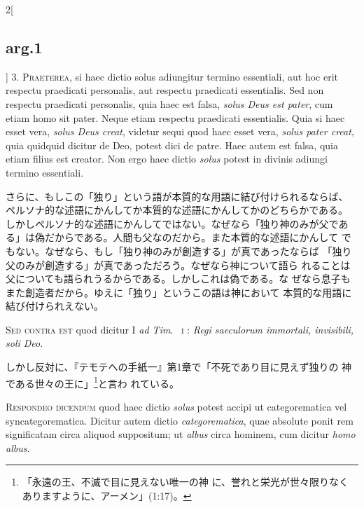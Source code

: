 \documentclass[paper=a4paper,fontsize=10pt,jafontsize=9pt,titlepage]{jlreq}
\begin{document}
\begin{paracol}{2}[\subsection{arg.1}]
3. {\scshape Praeterea}, si haec dictio solus adiungitur termino essentiali, aut hoc
 erit respectu praedicati personalis, aut respectu praedicati
 essentialis. Sed non respectu praedicati personalis, quia haec est
 falsa, {\itshape solus Deus est pater}, cum etiam homo sit pater. Neque etiam
 respectu praedicati essentialis. Quia si haec esset vera, {\itshape solus Deus
 creat}, videtur sequi quod haec esset vera, {\itshape solus pater creat}, quia
 quidquid dicitur de Deo, potest dici de patre. Haec autem est falsa,
 quia etiam filius est creator. Non ergo haec dictio {\itshape solus} potest in
 divinis adiungi termino essentiali.

\switchcolumn

さらに、もしこの「独り」という語が本質的な用語に結び付けられるならば、
 ペルソナ的な述語にかんしてか本質的な述語にかんしてかのどちらかである。
 しかしペルソナ的な述語にかんしてではない。なぜなら「独り神のみが父であ
 る」は偽だからである。人間も父なのだから。また本質的な述語にかんして
 でもない。なぜなら、もし「独り神のみが創造する」が真であったならば
 「独り父のみが創造する」が真であっただろう。なぜなら神について語ら
 れることは父についても語られうるからである。しかしこれは偽である。な
 ぜなら息子もまた創造者だから。ゆえに「独り」というこの語は神において
 本質的な用語に結び付けられえない。

\switchcolumn*[\subsection{s.c.}]

{\scshape Sed contra est} quod dicitur I {\itshape ad Tim}.~{\scshape
 i} : {\itshape Regi saeculorum immortali,
 invisibili, soli Deo}.

\switchcolumn

しかし反対に、『テモテへの手紙一』第1章で「不死であり目に見えず独りの
 神である世々の王に」\footnote{「永遠の王、不滅で目に見えない唯一の神
 に、誉れと栄光が世々限りなくありますように、アーメン」(1:17)。}と言わ
 れている。


{\scshape Respondeo dicendum} quod haec dictio {\itshape solus} potest accipi ut
 categorematica vel syncategorematica. Dicitur autem dictio
 {\itshape categorematica}, quae absolute ponit rem significatam circa aliquod
 suppositum; ut {\itshape albus} circa hominem, cum dicitur {\itshape homo albus}.


\end{paracol}
\end{document}
